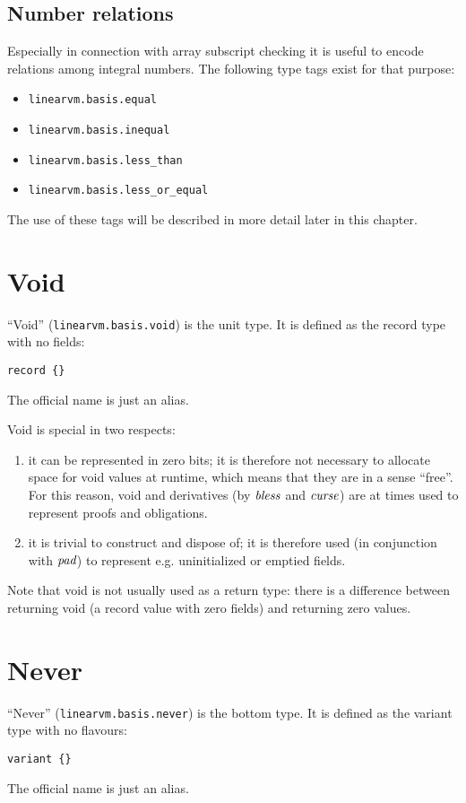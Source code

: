 \documentclass[a4paper]{book}
\newcommand\tyBless{{\ensuremath{\textnormal{\textit{bless}}}}}
\newcommand\tyCurse{{\ensuremath\textit{curse}}}
\newcommand\tyPad{{\ensuremath\textit{pad}}}
\begin{document}
\subsection*{Number relations}
Especially in connection with array subscript checking it is useful to encode
relations among integral numbers.
The following type tags exist for that purpose:

\begin{itemize}
\item \texttt{linearvm.basis.equal}
\item \texttt{linearvm.basis.inequal}
\item \texttt{linearvm.basis.less\_than}
\item \texttt{linearvm.basis.less\_or\_equal}
\end{itemize}

The use of these tags will be described in more detail later in this chapter.

\section{Void}
``Void'' (\texttt{linearvm.basis.void}) is the unit type.
It is defined as the record type with no fields:
\begin{center}
  \verb|record {}|
\end{center}
The official name is just an alias.

Void is special in two respects:
\begin{enumerate}
\item it can be represented in zero bits;
  it is therefore not necessary to allocate space for void values at
  runtime, which means that they are in a sense ``free''.
  For this reason, void and derivatives (by $\tyBless$ and
  $\tyCurse$) are at times used to represent proofs and obligations.
\item it is trivial to construct and dispose of;
  it is therefore used (in conjunction with $\tyPad$) to represent e.g.
  uninitialized or emptied fields.
\end{enumerate}

Note that void is not usually used as a return type: there is a
difference between returning void (a record value with zero fields)
and returning zero values.

\section{Never}
``Never'' (\texttt{linearvm.basis.never}) is the bottom type.
It is defined as the variant type with no flavours:
\begin{center}
  \verb|variant {}|
\end{center}
The official name is just an alias.
\end{document}
